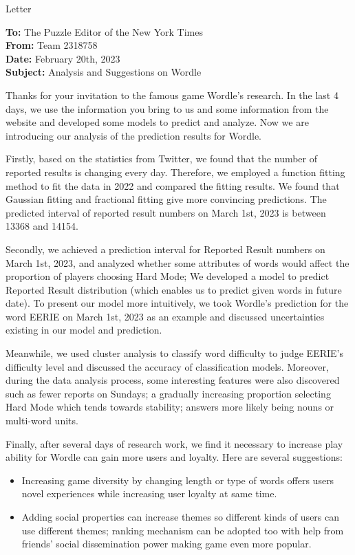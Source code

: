 \documentclass[12pt]{article}  %
\begin{document}
\begin{letter}{Letter}
\begin{flushleft}  %
\textbf{To:} The Puzzle Editor of the New York Times\\
\textbf{From:} Team 2318758\\
\textbf{Date:} February 20th, 2023\\
\textbf{Subject:} Analysis and Suggestions on Wordle
\end{flushleft}

Thanks for your invitation to the famous game Wordle's research. In the last 4 days, we use the information you bring to us and some information from the website and developed some models to predict and analyze. Now we are introducing our analysis of the prediction results for Wordle.
 
 Firstly, based on the statistics from Twitter, we found that the number of reported results is changing every day. Therefore, we employed a function fitting method to fit the data in 2022 and compared the fitting results. We found that Gaussian fitting and fractional fitting give more convincing predictions. The predicted interval of reported result numbers on March 1st, 2023 is between 13368 and 14154. 
 
Secondly, we achieved a prediction interval for Reported Result numbers on March 1st, 2023, and analyzed whether some attributes of words would affect the proportion of players choosing Hard Mode; We developed a model to predict Reported Result distribution (which enables us to predict given words in future date). To present our model more intuitively, we took Wordle's prediction for the word EERIE on March 1st, 2023 as an example and discussed uncertainties existing in our model and prediction.

 Meanwhile, we used cluster analysis to classify word difficulty to judge EERIE's difficulty level and discussed the accuracy of classification models. Moreover, during the data analysis process, some interesting features were also discovered such as fewer reports on Sundays; a gradually increasing proportion selecting Hard Mode which tends towards stability; answers more likely being nouns or multi-word units. 
 
Finally, after several days of research work, we find it necessary to increase play ability for Wordle can gain more users and loyalty. Here are several suggestions: 
\begin{itemize}
    \item Increasing game diversity by changing length or type of words offers users novel experiences while increasing user loyalty at same time.
    \item Adding social properties can increase themes so different kinds of users can use different themes; ranking mechanism can be adopted too with help from friends' social dissemination power making game even more popular.
\end{itemize}



\end{letter}
\end{document}
